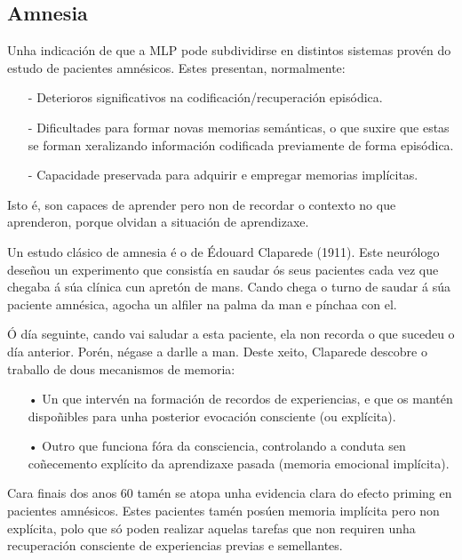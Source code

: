 \documentclass[a4paper,11pt]{article}
\begin{document}
\subsection{Amnesia}
Unha indicación de que a MLP pode subdividirse en distintos sistemas provén do estudo de pacientes amnésicos. Estes presentan, normalmente:
\begin{itemize}
	\item[-] Deterioros significativos na codificación/recuperación episódica.
	\item[-] Dificultades para formar novas memorias semánticas, o que suxire que estas se forman 			xeralizando información codificada previamente de forma episódica.
	\item[-] Capacidade preservada para adquirir e empregar memorias implícitas. 
\end{itemize}

Isto é, son capaces de aprender pero non de recordar o contexto no que aprenderon, porque olvidan a situación de aprendizaxe.

Un estudo clásico de amnesia é o de Édouard Claparede (1911). Este neurólogo deseñou un experimento que consistía en saudar ós seus pacientes cada vez que chegaba á súa clínica cun apretón de mans. Cando chega o turno de saudar á súa paciente amnésica, agocha un alfiler na palma da man e pínchaa con el.

Ó día seguinte, cando vai saludar a esta paciente, ela non recorda o que sucedeu o día anterior. Porén, négase a darlle a man. Deste xeito, Claparede descobre o traballo de dous mecanismos de memoria:
\begin{itemize}
	\item[•] Un que intervén na formación de recordos de experiencias, e que os mantén dispoñibles 			para unha posterior evocación consciente (ou explícita).
	\item[•] Outro que funciona fóra da consciencia, controlando a conduta sen coñecemento explícito 		da aprendizaxe pasada (memoria emocional implícita). 
\end{itemize}

Cara finais dos anos 60 tamén se atopa unha evidencia clara do efecto priming en pacientes amnésicos. Estes pacientes tamén posúen memoria implícita pero non explícita, polo que só poden realizar aquelas tarefas que non requiren unha recuperación consciente de experiencias previas e semellantes.

\newpage
\end{document}
